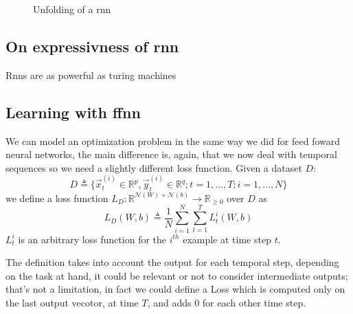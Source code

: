 \begin{figure}[h!]
\caption{Unfolding of a rnn}
\label{rnn_unfolding}
\end{figure}



\subsection{On expressivness of rnn}
Rnns are as powerful as turing machines
\subsection{Learning with ffnn}
We can model an optimization problem in the same way we did for feed foward neural networks, the main difference is, again, that we now deal with temporal sequences so we need a slightly different
loss function.
Given a dataset $D$:
\begin{equation}
D\triangleq\{\vec{x}_t^{(i)} \in \mathbb{R}^p, \vec{y}_t^{(i)} \in \mathbb{R}^q; t=1,...,T;  i=1,...,N\}
\end{equation}
we define a loss function $L_D:\mathbb{R}^{\mathcal{N}(W)+\mathcal{N}(b)} \rightarrow \mathbb{R}_{\geq 0}$ over $D$  as
\begin{equation}
L_D(W,b)\triangleq\frac{1}{N}\sum_{i=1}^N \sum_{t=1}^T L_t^i(W,b) 
\end{equation}
$L_t^i$ is an arbitrary loss function for the $i^{th}$ example at time step $t$.

The definition takes into account the output for each temporal step, depending on the task at hand, it could be relevant or not to consider intermediate
outputs; that's not a limitation, in fact we could define a Loss which is computed only on the last output vecotor, at time $T$, and adds 0 for each
other time step.



